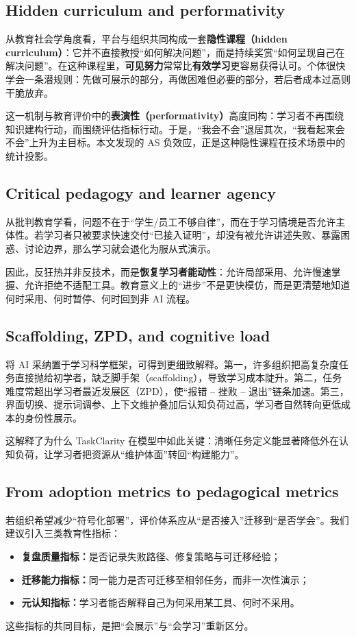 \documentclass[11pt,a4paper]{ctexart}
\begin{document}
\subsection{Hidden curriculum and performativity}
从教育社会学角度看，平台与组织共同构成一套\textbf{隐性课程（hidden curriculum）}：它并不直接教授“如何解决问题”，而是持续奖赏“如何呈现自己在解决问题”。在这种课程里，\textbf{可见努力}常常比\textbf{有效学习}更容易获得认可。个体很快学会一条潜规则：先做可展示的部分，再做困难但必要的部分，若后者成本过高则干脆放弃。

这一机制与教育评价中的\textbf{表演性（performativity）}高度同构：学习者不再围绕知识建构行动，而围绕评估指标行动。于是，“我会不会”退居其次，“我看起来会不会”上升为主目标。本文发现的 AS 负效应，正是这种隐性课程在技术场景中的统计投影。

\subsection{Critical pedagogy and learner agency}
从批判教育学看，问题不在于“学生/员工不够自律”，而在于学习情境是否允许主体性。若学习者只被要求快速交付“已接入证明”，却没有被允许讲述失败、暴露困惑、讨论边界，那么学习就会退化为服从式演示。

因此，反狂热并非反技术，而是\textbf{恢复学习者能动性}：允许局部采用、允许慢速掌握、允许拒绝不适配工具。教育意义上的“进步”不是更快模仿，而是更清楚地知道何时采用、何时暂停、何时回到非 AI 流程。

\subsection{Scaffolding, ZPD, and cognitive load}
将 AI 采纳置于学习科学框架，可得到更细致解释。第一，许多组织把高复杂度任务直接抛给初学者，缺乏脚手架（scaffolding），导致学习成本陡升。第二，任务难度常超出学习者最近发展区（ZPD），使“报错 -- 挫败 -- 退出”链条加速。第三，界面切换、提示词调参、上下文维护叠加后认知负荷过高，学习者自然转向更低成本的身份性展示。

这解释了为什么 TaskClarity 在模型中如此关键：清晰任务定义能显著降低外在认知负荷，让学习者把资源从“维护体面”转回“构建能力”。

\subsection{From adoption metrics to pedagogical metrics}
若组织希望减少“符号化部署”，评价体系应从“是否接入”迁移到“是否学会”。我们建议引入三类教育性指标：
\begin{itemize}[leftmargin=1.2em]
\item \textbf{复盘质量指标：}是否记录失败路径、修复策略与可迁移经验；
\item \textbf{迁移能力指标：}同一能力是否可迁移至相邻任务，而非一次性演示；
\item \textbf{元认知指标：}学习者能否解释自己为何采用某工具、何时不采用。
\end{itemize}
这些指标的共同目标，是把“会展示”与“会学习”重新区分。
\end{document}

